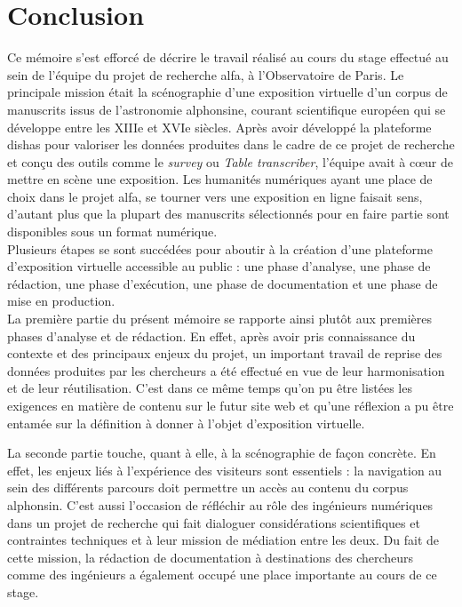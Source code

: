 \chapter*{Conclusion}
	Ce mémoire s'est efforcé de décrire le travail réalisé au cours du stage effectué au sein de l'équipe du projet de recherche \acrshort{alfa}, à l'Observatoire de Paris. Le principale mission était la scénographie d'une exposition virtuelle d'un corpus de manuscrits issus de l'astronomie alphonsine, courant scientifique européen qui se développe entre les XIIIe et XVIe siècles. Après avoir développé la plateforme \acrshort{dishas} pour valoriser les données produites dans le cadre de ce projet de recherche et conçu des outils comme le \textit{survey} ou \textit{Table transcriber}, l'équipe avait à cœur de mettre en scène une exposition. Les humanités numériques ayant une place de choix dans le projet \acrshort{alfa}, se tourner vers une exposition en ligne faisait sens, d'autant plus que la plupart des manuscrits sélectionnés pour en faire partie sont disponibles sous un format numérique. \\
	
	Plusieurs étapes se sont succédées pour aboutir à la création d'une plateforme d'exposition virtuelle accessible au public : une phase d'analyse, une phase de rédaction, une phase d'exécution, une phase de documentation et une phase de mise en production. \\
	
	La première partie du présent mémoire se rapporte ainsi plutôt aux premières phases d'analyse et de rédaction. En effet, après avoir pris connaissance du contexte et des principaux enjeux du projet, un important travail de reprise des données produites par les chercheurs a été effectué en vue de leur harmonisation et de leur réutilisation. C'est dans ce même temps qu'on pu être listées les exigences en matière de contenu sur le futur site web et qu'une réflexion a pu être entamée sur la définition à donner à l'objet d'exposition virtuelle. 
	
	La seconde partie touche, quant à elle, à la scénographie de façon concrète. En effet, les enjeux liés à l'expérience des visiteurs sont essentiels : la navigation au sein des différents parcours doit permettre un accès au contenu du corpus alphonsin. C'est aussi l'occasion de réfléchir au rôle des ingénieurs numériques dans un projet de recherche qui fait dialoguer considérations scientifiques et contraintes techniques et à leur mission de médiation entre les deux. Du fait de cette mission, la rédaction de documentation à destinations des chercheurs comme des ingénieurs a également occupé une place importante au cours de ce stage.
	
